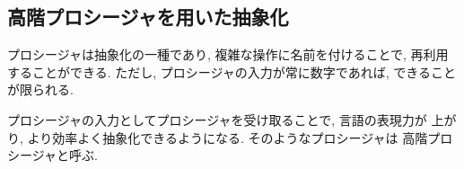 \setcounter{section}{1}
\setcounter{subsection}{2}
\subsection{高階プロシージャを用いた抽象化}
プロシージャは抽象化の一種であり, 複雑な操作に名前を付けることで,
再利用することができる. ただし, プロシージャの入力が常に数字であれば,
できることが限られる.

プロシージャの入力としてプロシージャを受け取ることで, 言語の表現力が
上がり, より効率よく抽象化できるようになる. そのようなプロシージャは
高階プロシージャと呼ぶ.


%

%

%

